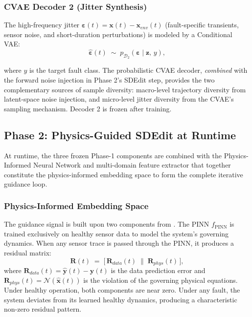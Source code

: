 \documentclass[conference]{IEEEtran}
\newcommand{\DecTwo}{\mathcal{D}_2}
\newcommand{\PINN}{f_{\text{PINN}}}
\newcommand{\z}{\mathbf{z}}
\newcommand{\x}{\mathbf{x}}
\newcommand{\R}{\mathbf{R}}
\begin{document}
\subsubsection{CVAE Decoder 2 (Jitter Synthesis)}

The high-frequency jitter $\boldsymbol{\varepsilon}(t)=\x(t)-\x_{env}(t)$ (fault-specific transients, sensor noise, and short-duration perturbations) is modeled by a Conditional VAE:
\begin{equation}
  \hat{\boldsymbol{\varepsilon}}(t) \;\sim\;
    p_{\DecTwo}(\boldsymbol{\varepsilon}\mid\z,\,y),
  \label{eq:cvae}
\end{equation}


where $y$ is the target fault class. The probabilistic CVAE decoder, \emph{combined} with the forward noise injection in Phase 2's SDEdit step, provides the two complementary sources of sample diversity: macro-level trajectory diversity from latent-space noise injection, and micro-level jitter diversity from the CVAE's sampling mechanism. Decoder 2 is frozen after training.

\subsection{Phase 2: Physics-Guided SDEdit at Runtime}
\label{subsec:phase2}

At runtime, the three frozen Phase-1 components are combined with the Physics-Informed Neural Network and multi-domain feature extractor \cite{spotorno2026linking} that together constitute the physics-informed embedding space to form the complete iterative guidance loop.

\subsubsection{Physics-Informed Embedding Space}

The guidance signal is built upon two components from \cite{spotorno2026linking}. The PINN $\PINN$ is trained exclusively on healthy sensor data to model the system's governing dynamics. When any sensor trace is passed through the PINN, it produces a residual matrix:
\begin{equation}
  \R(t) \;=\;
  \bigl[\,\R_{data}(t)\;\|\;\R_{phys}(t)\,\bigr],
  \label{eq:residual}
\end{equation}
where $\R_{data}(t)=\hat{\mathbf{y}}(t)-\mathbf{y}(t)$ is the data prediction error and $\R_{phys}(t)=\mathcal{N}(\hat{\x}(t))$ is the violation of the governing physical equations. Under healthy operation, both components are near zero. Under any fault, the system deviates from its learned healthy dynamics, producing a characteristic non-zero residual pattern.
\end{document}
